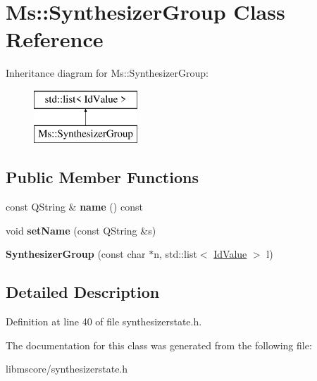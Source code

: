 \hypertarget{class_ms_1_1_synthesizer_group}{}\section{Ms\+:\+:Synthesizer\+Group Class Reference}
\label{class_ms_1_1_synthesizer_group}
Inheritance diagram for Ms\+:\+:Synthesizer\+Group\+:\begin{figure}[H]
\begin{center}
\leavevmode
\includegraphics[height=2.000000cm]{class_ms_1_1_synthesizer_group}
\end{center}
\end{figure}
\subsection*{Public Member Functions}
\begin{DoxyCompactItemize}
\item 
\mbox{\label{class_ms_1_1_synthesizer_group_a2dd2e4f261428e1cc1e4fe72fe0930e7}} 
const Q\+String \& {\bfseries name} () const
\item 
\mbox{\label{class_ms_1_1_synthesizer_group_a472d3402c3a388d8ec899470915482cc}} 
void {\bfseries set\+Name} (const Q\+String \&s)
\item 
\mbox{\label{class_ms_1_1_synthesizer_group_a645e1c355a9faba954adaeebe7a6d5a5}} 
{\bfseries Synthesizer\+Group} (const char $\ast$n, std\+::list$<$ \hyperlink{struct_ms_1_1_id_value}{Id\+Value} $>$ l)
\end{DoxyCompactItemize}


\subsection{Detailed Description}


Definition at line 40 of file synthesizerstate.\+h.



The documentation for this class was generated from the following file\+:\begin{DoxyCompactItemize}
\item 
libmscore/synthesizerstate.\+h\end{DoxyCompactItemize}
